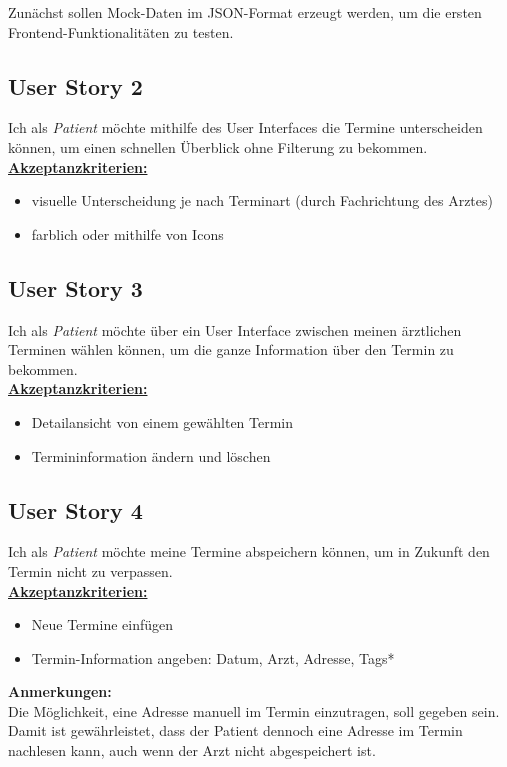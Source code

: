 \documentclass[conference]{IEEEtran}
\begin{document}
Zunächst sollen Mock-Daten im JSON-Format erzeugt werden, um die ersten Frontend-Funktionalitäten zu testen.

\subsection{User Story 2}
Ich als \textit{Patient} möchte mithilfe des User Interfaces die Termine unterscheiden können, um einen schnellen Überblick ohne Filterung zu bekommen.\\
\underline{\textbf{Akzeptanzkriterien:}}
\begin{itemize}
	\item visuelle Unterscheidung je nach Terminart (durch Fachrichtung des Arztes)
	\item farblich oder mithilfe von Icons
\end{itemize}

\subsection{User Story 3}
Ich als \textit{Patient} möchte über ein User Interface zwischen meinen ärztlichen Terminen wählen können, um die ganze Information über den Termin zu bekommen.\\
\underline{\textbf{Akzeptanzkriterien:}}
\begin{itemize}
	\item Detailansicht von einem gewählten Termin
	\item Termininformation ändern und löschen
\end{itemize}

\subsection{User Story 4}
Ich als \textit{Patient} möchte meine Termine abspeichern können, um in Zukunft den Termin nicht zu verpassen.\\
\underline{\textbf{Akzeptanzkriterien:}}
\begin{itemize}
	\item Neue Termine einfügen
	\item Termin-Information angeben: Datum, Arzt, Adresse, Tags*
\end{itemize}
\textbf{Anmerkungen:}\\
Die Möglichkeit, eine Adresse manuell im Termin einzutragen, soll gegeben sein. Damit ist gewährleistet, dass der Patient dennoch eine Adresse im Termin nachlesen kann, auch wenn der Arzt nicht abgespeichert ist. 
\end{document}
